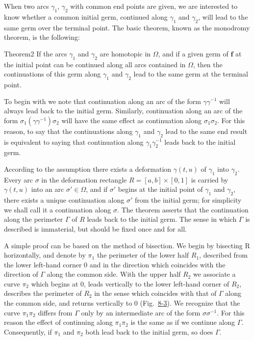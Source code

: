 When two arcs $\gamma_{1}$, $\gamma_{2}$ with common end points are given, we are interested to know whether a common initial germ, continued along $\gamma_{1}$ and $\gamma_{2}$, will lead to the same germ over the terminal point. The basic theorem, known as the monodromy theorem, is the following:

\begin{originalstatement}{Theorem}{2}\label{thm:8.2}
If the arcs $\gamma_{1}$ and $\gamma_{2}$ are homotopic in $\Omega$, and if a given germ of $\mathbf{f}$ at the initial point can be continued along all arcs contained in $\Omega$, then the continuations of this germ along $\gamma_{1}$ and $\gamma_{2}$ lead to the same germ at the terminal point.
\end{originalstatement}
To begin with we note that continuation along an arc of the form $\gamma\gamma^{-1}$ will always lead back to the initial germ. Similarly, continuation along an arc of the form $\sigma_{1}(\gamma\gamma^{-1})\sigma_{2}$ will have the same effect as continuation along $\sigma_{1}\sigma_{2}$. For this reason, to say that the continuations along $\gamma_{1}$ and $\gamma_{2}$ lead to the same end result is equivalent to saying that continuation along $\gamma_{1}\gamma_{2}^{-1}$ leads back to the initial germ.

According to the assumption there exists a deformation $\gamma(t,u)$ of $\gamma_{1}$ into $\gamma_{2}$. Every arc $\sigma$ in the deformation rectangle $R = [a,b] \times [0,1]$ is carried by $\gamma(t,u)$ into an arc $\sigma' \in \Omega$, and if $\sigma'$ begins at the initial point of $\gamma_{1}$ and $\gamma_{2}$, there exists a unique continuation along $\sigma'$ from the initial germ; for simplicity we shall call it a continuation along $\sigma$. The theorem asserts that the continuation along the perimeter $\Gamma$ of $R$ leads back to the initial germ. The sense in which $\Gamma$ is described is immaterial, but should be fixed once and for all.

A simple proof can be based on the method of bisection. We begin by bisecting R horizontally, and denote by $\pi_{1}$ the perimeter of the lower half $R_{1}$, described from the lower left-hand corner 0 and in the direction which coincides with the direction of $\Gamma$ along the common side. With the upper half $R_{2}$ we associate a curve $\pi_{2}$ which begins at 0, leads vertically to the lower left-hand corner of $R_{2}$, describes the perimeter of $R_{2}$ in the sense which coincides with that of $\Gamma$ along the common side, and returns vertically to 0 (Fig.~\hyperref[fig:8-3]{8-3}). We recognize that the curve $\pi_{1}\pi_{2}$ differs from $\Gamma$ only by an intermediate arc of the form $\sigma\sigma^{-1}$. For this reason the effect of continuing along $\pi_{1}\pi_{2}$ is the same as if we continue along $\Gamma$. Consequently, if $\pi_{1}$ and $\pi_{2}$ both lead back to the initial germ, so does $\Gamma$.


